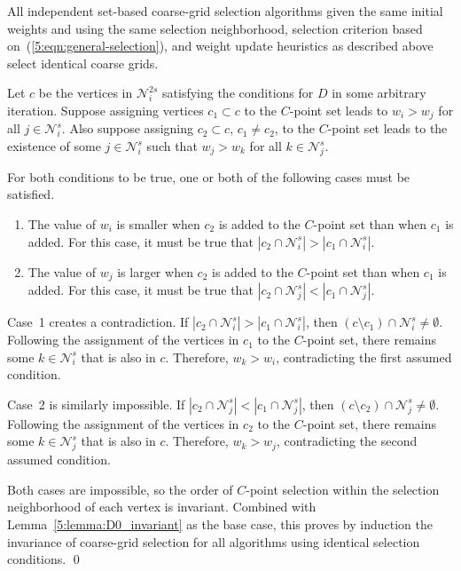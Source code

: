 \documentclass{elsart}
\newenvironment{proof}{\begin{pf}}{\qed\end{pf}}
\begin{document}
\begin{thm}
\label{5:theorem:invariance}
All independent set-based coarse-grid selection algorithms given the
same initial weights and using the same selection neighborhood,
selection criterion based on~(\ref{5:eqn:general-selection}), and
weight update heuristics as described above select identical coarse
grids.
\end{thm}
\begin{proof}
Let $c$ be the vertices in $\mathcal{N}_i^{2s}$ satisfying the
conditions for $D$ in some arbitrary iteration. Suppose assigning
vertices $c_1 \subset c$ to the $C$-point set leads to $w_i > w_j$ for
all $j \in \mathcal{N}_i^s$. Also suppose assigning $c_2 \subset c$,
$c_1 \ne c_2$, to the $C$-point set leads to the existence of some $j
\in \mathcal{N}_i^s$ such that $w_j > w_k$ for all $k \in
\mathcal{N}_j^s$.

For both conditions to be true, one or both of the following cases
must be satisfied.
\begin{enumerate}
\item The value of $w_i$ is smaller when $c_2$ is added to the
  $C$-point set than when $c_1$ is added. For this case, it must be
  true that $|c_2 \cap \mathcal{N}_i^s| > |c_1 \cap \mathcal{N}_i^s|$.
\item The value of $w_j$ is larger when $c_2$ is added to the
  $C$-point set than when $c_1$ is added. For this case, it must be
  true that $|c_2 \cap \mathcal{N}_j^s| < |c_1 \cap
  \mathcal{N}_j^s|$.
\end{enumerate}

Case~1 creates a contradiction. If $|c_2 \cap \mathcal{N}_i^s| > |c_1
\cap \mathcal{N}_i^s|$, then $(c \setminus c_1) \cap \mathcal{N}_i^s
\ne \emptyset$. Following the assignment of the vertices in $c_1$ to
the $C$-point set, there remains some $k \in \mathcal{N}_i^s$ that is
also in $c$. Therefore, $w_k > w_i$, contradicting the first assumed
condition.

Case~2 is similarly impossible. If $|c_2 \cap \mathcal{N}_j^s| < |c_1
\cap \mathcal{N}_j^s|$, then $(c \setminus c_2) \cap \mathcal{N}_j^s
\ne \emptyset$. Following the assignment of the vertices in $c_2$ to
the $C$-point set, there remains some $k \in \mathcal{N}_j^s$ that is
also in $c$. Therefore, $w_k > w_j$, contradicting the second assumed
condition.

Both cases are impossible, so the order of $C$-point selection within
the selection neighborhood of each vertex is invariant. Combined with
Lemma~\ref{5:lemma:D0_invariant} as the base case, this proves by
induction the invariance of coarse-grid selection for all algorithms
using identical selection conditions.
\end{proof}
\end{document}
